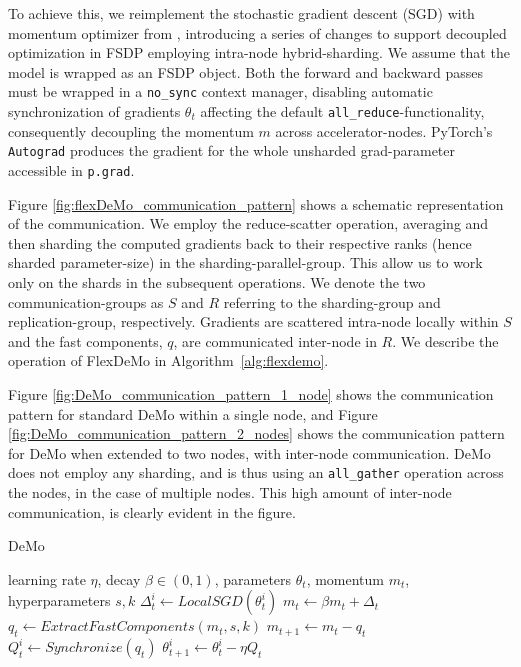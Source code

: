 To achieve this, we reimplement the stochastic gradient descent (SGD) with momentum optimizer from \cite{peng2024demodecoupledmomentumoptimization}, introducing a series of changes to support decoupled optimization in FSDP employing intra-node hybrid-sharding. We assume that the model is wrapped as an FSDP object. Both the forward and backward passes must be wrapped in a \texttt{no\_sync} context manager, disabling automatic synchronization of gradients $\theta_t$ %
affecting the default \texttt{all\_reduce}-functionality, consequently decoupling the momentum $m$ across accelerator-nodes. PyTorch's \texttt{Autograd} produces the gradient for the whole unsharded grad-parameter accessible in \texttt{p.grad}.

Figure \ref{fig:flexDeMo_communication_pattern} shows a schematic representation of the communication. We employ the reduce-scatter operation, averaging and then sharding the computed gradients back to their respective ranks (hence sharded parameter-size) in the sharding-parallel-group. This allow us to work only on the shards in the subsequent operations. 
We denote the two communication-groups as $S$ and $R$ referring to the sharding-group and replication-group, respectively. Gradients are scattered intra-node locally within $S$ and the fast components, $q$, are communicated inter-node in $R$. We describe the operation of FlexDeMo in Algorithm~\ref{alg:flexdemo}.

Figure \ref{fig:DeMo_communication_pattern_1_node} shows the communication pattern for standard DeMo within a single node, and Figure \ref{fig:DeMo_communication_pattern_2_nodes} shows the communication pattern for DeMo when extended to two nodes, with inter-node communication. DeMo does not employ any sharding, and is thus using an \texttt{all\_gather} operation across the nodes, in the case of multiple nodes. This high amount of inter-node communication, is clearly evident in the figure.


\renewcommand{\algorithmicrequire}{\textbf{Input:}}
\renewcommand{\algorithmicensure}{\textbf{Output:}}
\begin{algorithm}
\caption{DeMo}\label{alg:demo}
    \begin{algorithmic}
        \Require learning rate $\eta$, decay $\beta \in (0,1)$, parameters $\theta_t$, momentum $m_t$, 
        \Require hyperparameters $s, k$
        \State $\Delta_t^i \leftarrow LocalSGD(\theta_t^i )$ 
        \State $m_t \leftarrow \beta m_t + \Delta_t$ 
        \State $q_t \leftarrow  ExtractFastComponents(m_t, s, k)$  
        \State $m_{t+1} \leftarrow m_t - q_t$ 
        \State $Q_t^i \leftarrow Synchronize(q_t)$ 
        \State $\theta_{t+1}^i \leftarrow \theta_t^i - \eta Q_t$ 
    \end{algorithmic}
    \label{alg:demo}
\end{algorithm}

